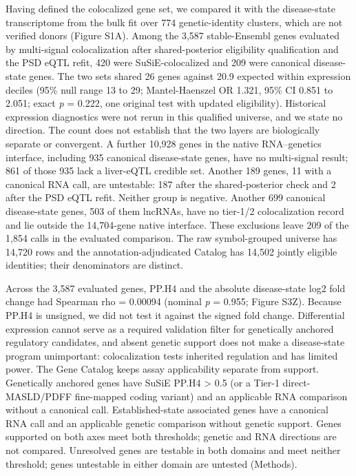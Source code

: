 Having defined the colocalized gene set, we compared it with the disease-state transcriptome from the bulk fit over 774 genetic-identity clusters, which are not verified donors (Figure S1A). Among the 3,587 stable-Ensembl genes evaluated by multi-signal colocalization after shared-posterior eligibility qualification and the PSD eQTL refit, 420 were SuSiE-colocalized and 209 were canonical disease-state genes. The two sets shared 26 genes against 20.9 expected within expression deciles (95\% null range 13 to 29; Mantel-Haenszel OR 1.321, 95\% CI 0.851 to 2.051; exact \emph{p} = 0.222, one original test with updated eligibility). Historical expression diagnostics were not rerun in this qualified universe, and we state no direction. The count does not establish that the two layers are biologically separate or convergent. A further 10,928 genes in the native RNA--genetics interface, including 935 canonical disease-state genes, have no multi-signal result; 861 of those 935 lack a liver-eQTL credible set. Another 189 genes, 11 with a canonical RNA call, are untestable: 187 after the shared-posterior check and 2 after the PSD eQTL refit. Neither group is negative. Another 699 canonical disease-state genes, 503 of them lncRNAs, have no tier-1/2 colocalization record and lie outside the 14,704-gene native interface. These exclusions leave 209 of the 1,854 calls in the evaluated comparison. The raw symbol-grouped universe has 14,720 rows and the annotation-adjudicated Catalog has 14,502 jointly eligible identities; their denominators are distinct.

Across the 3,587 evaluated genes, PP.H4 and the absolute disease-state log2 fold change had Spearman rho = 0.00094 (nominal \emph{p} = 0.955; Figure S3Z). Because PP.H4 is unsigned, we did not test it against the signed fold change. Differential expression cannot serve as a required validation filter for genetically anchored regulatory candidates, and absent genetic support does not make a disease-state program unimportant: colocalization tests inherited regulation and has limited power. The Gene Catalog keeps assay applicability separate from support. Genetically anchored genes have SuSiE PP.H4 \textgreater{} 0.5 (or a Tier-1 direct-MASLD/PDFF fine-mapped coding variant) and an applicable RNA comparison without a canonical call. Established-state associated genes have a canonical RNA call and an applicable genetic comparison without genetic support. Genes supported on both axes meet both thresholds; genetic and RNA directions are not compared. Unresolved genes are testable in both domains and meet neither threshold; genes untestable in either domain are untested (Methods).

